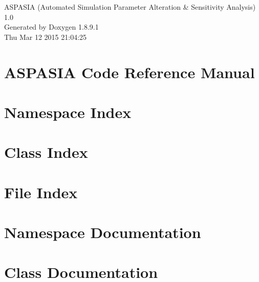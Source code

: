 \documentclass[twoside]{book}
\newcommand{\+}{\discretionary{\mbox{\scriptsize$\hookleftarrow$}}{}{}}
\newcommand{\clearemptydoublepage}{%
  \newpage{\pagestyle{empty}\cleardoublepage}%
}
\begin{document}
\hypersetup{pageanchor=false,
             bookmarks=true,
             bookmarksnumbered=true,
             pdfencoding=unicode
            }
\begin{titlepage}
\vspace*{7cm}
\begin{center}%
{\Large A\+S\+P\+A\+S\+I\+A (Automated Simulation Parameter Alteration \& Sensitivity Analysis) \\[1ex]\large 1.\+0 }\\
\vspace*{1cm}
{\large Generated by Doxygen 1.8.9.1}\\
\vspace*{0.5cm}
{\small Thu Mar 12 2015 21:04:25}\\
\end{center}
\end{titlepage}
\clearemptydoublepage
\tableofcontents
\clearemptydoublepage
{}
\hypersetup{pageanchor=true}

\chapter{A\+S\+P\+A\+S\+I\+A Code Reference Manual}
\label{index}\hypertarget{index}{}
\chapter{Namespace Index}

\chapter{Class Index}

\chapter{File Index}

\chapter{Namespace Documentation}




\chapter{Class Documentation}













\end{document}
